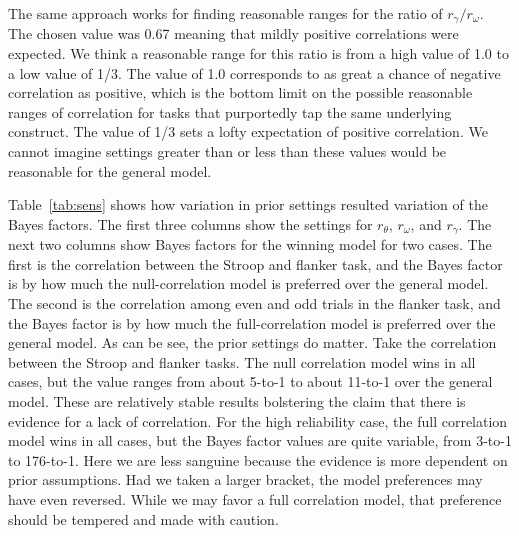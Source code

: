 \documentclass[english,man]{apa6}
\theoremstyle{definition}
\theoremstyle{definition}
\theoremstyle{remark}
\begin{document}
The same approach works for finding reasonable ranges for the ratio of
\(r_\gamma/r_\omega\). The chosen value was 0.67 meaning that mildly
positive correlations were expected. We think a reasonable range for
this ratio is from a high value of 1.0 to a low value of 1/3. The value
of 1.0 corresponds to as great a chance of negative correlation as
positive, which is the bottom limit on the possible reasonable ranges of
correlation for tasks that purportedly tap the same underlying
construct. The value of 1/3 sets a lofty expectation of positive
correlation. We cannot imagine settings greater than or less than these
values would be reasonable for the general model.

Table~\ref{tab:sens} shows how variation in prior settings resulted
variation of the Bayes factors. The first three columns show the
settings for \(r_\theta\), \(r_\omega\), and \(r_\gamma\). The next two
columns show Bayes factors for the winning model for two cases. The
first is the correlation between the Stroop and flanker task, and the
Bayes factor is by how much the null-correlation model is preferred over
the general model. The second is the correlation among even and odd
trials in the flanker task, and the Bayes factor is by how much the
full-correlation model is preferred over the general model. As can be
see, the prior settings do matter. Take the correlation between the
Stroop and flanker tasks. The null correlation model wins in all cases,
but the value ranges from about 5-to-1 to about 11-to-1 over the general
model. These are relatively stable results bolstering the claim that
there is evidence for a lack of correlation. For the high reliability
case, the full correlation model wins in all cases, but the Bayes factor
values are quite variable, from 3-to-1 to 176-to-1. Here we are less
sanguine because the evidence is more dependent on prior assumptions.
Had we taken a larger bracket, the model preferences may have even
reversed. While we may favor a full correlation model, that preference
should be tempered and made with caution.
\end{document}
